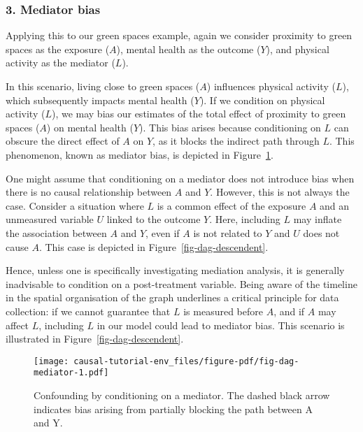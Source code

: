 \documentclass[
  singlecolumn]{article}
\begin{document}
\hypertarget{mediator-bias}{%
\subsubsection{3. Mediator bias}\label{mediator-bias}}

Applying this to our green spaces example, again we consider proximity
to green spaces as the exposure (\(A\)), mental health as the outcome
(\(Y\)), and physical activity as the mediator (\(L\)).

In this scenario, living close to green spaces (\(A\)) influences
physical activity (\(L\)), which subsequently impacts mental health
(\(Y\)). If we condition on physical activity (\(L\)), we may bias our
estimates of the total effect of proximity to green spaces (\(A\)) on
mental health (\(Y\)). This bias arises because conditioning on \(L\)
can obscure the direct effect of \(A\) on \(Y\), as it blocks the
indirect path through \(L\). This phenomenon, known as mediator bias, is
depicted in Figure~\ref{fig-dag-mediator}.

One might assume that conditioning on a mediator does not introduce bias
when there is no causal relationship between \(A\) and \(Y\). However,
this is not always the case. Consider a situation where \(L\) is a
common effect of the exposure \(A\) and an unmeasured variable \(U\)
linked to the outcome \(Y\). Here, including \(L\) may inflate the
association between \(A\) and \(Y\), even if \(A\) is not related to
\(Y\) and \(U\) does not cause \(A\). This case is depicted in
Figure~\ref{fig-dag-descendent}.

Hence, unless one is specifically investigating mediation analysis, it
is generally inadvisable to condition on a post-treatment variable.
Being aware of the timeline in the spatial organisation of the graph
underlines a critical principle for data collection: if we cannot
guarantee that \(L\) is measured before \(A\), and if \(A\) may affect
\(L\), including \(L\) in our model could lead to mediator bias. This
scenario is illustrated in Figure~\ref{fig-dag-descendent}.

\begin{figure}

{\centering \texttt{[image: causal-tutorial-env\_files/figure-pdf/fig-dag-mediator-1.pdf]}

}

\caption{\label{fig-dag-mediator}Confounding by conditioning on a
mediator. The dashed black arrow indicates bias arising from partially
blocking the path between A and Y.}

\end{figure}
\end{document}
